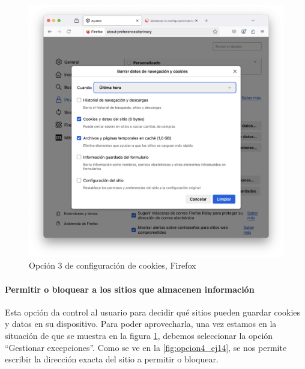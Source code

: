 \begin{figure}[H]   
    \centering
    \includegraphics[width=\textwidth]{opcion3_ej14.png}
    \caption{Opción 3 de configuración de cookies, Firefox}
    \label{fig:opcion3_ej14}
\end{figure}

\paragraph{Permitir o bloquear a los sitios que almacenen información }

Esta opción da control al usuario para decidir qué sitios pueden guardar cookies y datos en su dispositivo. Para poder aprovecharla, una vez estamos en la situación de que se muestra en la figura \ref{fig:opcion3_ej14}, debemos seleccionar la opción “Gestionar excepciones”. Como se ve en la \ref{fig:opcion4_ej14}, se nos permite escribir la dirección exacta del sitio a permitir o bloquear.

